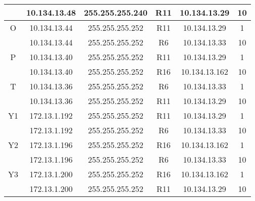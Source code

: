 \documentclass[12pt, a4paper, spanish]{article}
\begin{document}
\begin{center}
\begin{tabular}{|c|c|c|c|c|c|}
	 & 10.134.13.48 & 255.255.255.240 & R11 & 10.134.13.29 & 10\\
	\hline
	O & 10.134.13.44 & 255.255.255.252 & R11 & 10.134.13.29 & 1\\
	 & 10.134.13.44 & 255.255.255.252 & R6 & 10.134.13.33 & 10\\
	\hline
	P & 10.134.13.40 & 255.255.255.252 & R11 & 10.134.13.29 & 1\\
	 & 10.134.13.40 & 255.255.255.252 & R16 & 10.134.13.162 & 10\\
	\hline
	T & 10.134.13.36 & 255.255.255.252 & R6 & 10.134.13.33 & 1\\
	 & 10.134.13.36 & 255.255.255.252 & R11 & 10.134.13.29 & 10\\
	\hline
	Y1 & 172.13.1.192 & 255.255.255.252 & R11 & 10.134.13.29 & 1\\
	 & 172.13.1.192 & 255.255.255.252 & R6 & 10.134.13.33 & 10\\
	\hline
	Y2 & 172.13.1.196 & 255.255.255.252 & R16 & 10.134.13.162 & 1\\
	 & 172.13.1.196 & 255.255.255.252 & R6 & 10.134.13.33 & 10\\
	\hline
	Y3 & 172.13.1.200 & 255.255.255.252 & R16 & 10.134.13.162 & 1\\
	 & 172.13.1.200 & 255.255.255.252 & R11 & 10.134.13.29 & 10\\
	\hline
\end{tabular}
\end{center}
\end{document}
